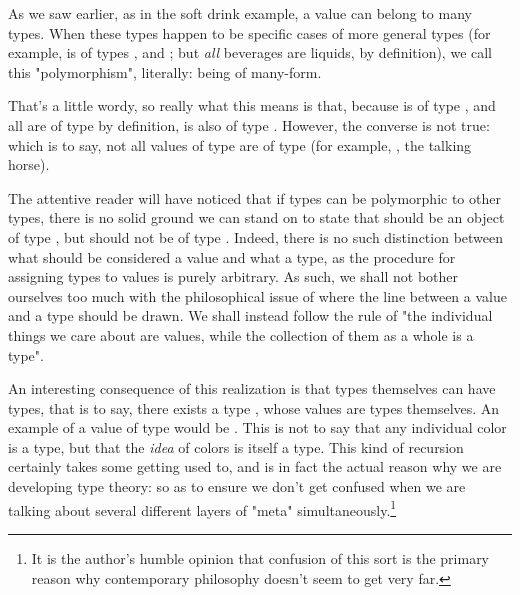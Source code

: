 As we saw earlier, as in the soft drink example, a value can belong to many types. When these types happen to be
specific cases of more general types (for example, \value{cola} is of types ,  and
; but \textit{all} beverages are liquids, by definition), we call this "polymorphism", literally:
being of many-form.


That's a little wordy, so really what this means is that, because \value{Socrates} is of type , and all
 are of type  by definition, \value{Socrates} is also of type . However, the
converse is not true: which is to say, not all values of type  are of type  (for example,
\value{Mr. Ed}, the talking horse).

The attentive reader will have noticed that if types can be polymorphic to other types, there is no solid ground we can
stand on to state that \value{cola} should be an object of type , but \value{soft drink} should not
be of type . Indeed, there is no such distinction between what should be considered a value and what a
type, as the procedure for assigning types to values is purely arbitrary. As
such, we shall not bother ourselves too much with the philosophical issue of where the line between a value and a type
should be drawn. We shall instead follow the rule of "the individual things we care about are values, while the
collection of them as a whole is a type".

An interesting consequence of this realization is that types themselves can have types, that is to say, there exists a
type , whose values are types themselves. An example of a value of type  would be
. This is not to say that any individual color is a type, but that the \textit{idea} of colors is itself a
type. This kind of recursion certainly takes some getting used to, and is in fact the actual reason why we are
developing type theory: so as to ensure we don't get confused when we are talking about several different layers of
"meta" simultaneously.\footnote{It is the author's humble opinion that confusion of this sort is the primary reason why
contemporary philosophy doesn't seem to get very far.}


